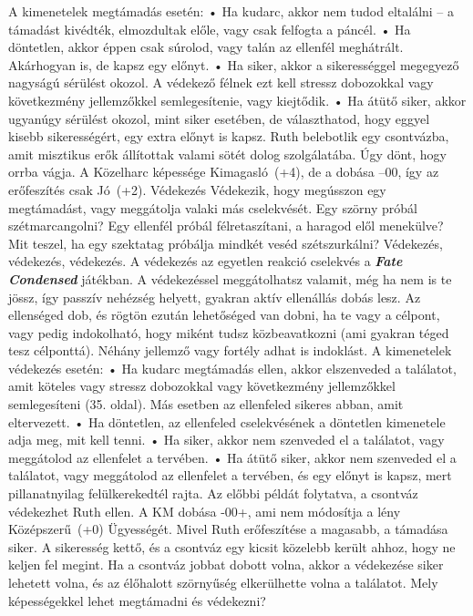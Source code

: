 \documentclass[oneside]{book}
\newcommand{\fate}[1]{\textbf{\textit{#1}}}
\begin{document}
A kimenetelek megtámadás esetén:
    • Ha kudarc, akkor nem tudod eltalálni – a támadást kivédték, elmozdultak előle, vagy csak felfogta a páncél.
    • Ha döntetlen, akkor éppen csak súrolod, vagy talán az ellenfél meghátrált. Akárhogyan is, de kapsz egy előnyt.
    • Ha siker, akkor a sikerességgel megegyező nagyságú sérülést okozol. A védekező félnek ezt kell stressz dobozokkal vagy következmény jellemzőkkel semlegesítenie, vagy kiejtődik.
    • Ha átütő siker, akkor ugyanúgy sérülést okozol, mint siker esetében, de választhatod, hogy eggyel kisebb sikerességért, egy extra előnyt is kapsz.
Ruth belebotlik egy csontvázba, amit misztikus erők állítottak valami sötét dolog szolgálatába. Úgy dönt, hogy orrba vágja. A Közelharc képessége Kimagasló~(+4), de a dobása --00, így az erőfeszítés csak Jó~(+2).
Védekezés
Védekezik, hogy megússzon egy megtámadást, vagy meggátolja valaki más cselekvését.
Egy szörny próbál szétmarcangolni? Egy ellenfél próbál félretaszítani, a haragod elől menekülve? Mit teszel, ha egy szektatag próbálja mindkét veséd szétszurkálni? Védekezés, védekezés, védekezés.
A védekezés az egyetlen reakció cselekvés a \fate{Fate Condensed} játékban. A védekezéssel meggátolhatsz valamit, még ha nem is te jössz, így passzív nehézség helyett, gyakran aktív ellenállás dobás lesz. Az ellenséged dob, és rögtön ezután lehetőséged van dobni, ha te vagy a célpont, vagy pedig indokolható, hogy miként tudsz közbeavatkozni (ami gyakran téged tesz célponttá). Néhány jellemző vagy fortély adhat is indoklást.
A kimenetelek védekezés esetén:
    • Ha kudarc megtámadás ellen, akkor elszenveded a találatot, amit köteles vagy stressz dobozokkal vagy következmény jellemzőkkel semlegesíteni (35. oldal). Más esetben az ellenfeled sikeres abban, amit eltervezett.
    • Ha döntetlen, az ellenfeled cselekvésének a döntetlen kimenetele adja meg, mit kell tenni.
    • Ha siker, akkor nem szenveded el a találatot, vagy meggátolod az ellenfelet a tervében.
    • Ha átütő siker, akkor nem szenveded el a találatot, vagy meggátolod az ellenfelet a tervében, és egy előnyt is kapsz, mert pillanatnyilag felülkerekedtél rajta.
Az előbbi példát folytatva, a csontváz védekezhet Ruth ellen. A KM dobása -00+, ami nem módosítja a lény Középszerű~(+0) Ügyességét.
Mivel Ruth erőfeszítése a magasabb, a támadása siker. A sikeresség kettő, és a csontváz egy kicsit közelebb került ahhoz, hogy ne keljen fel megint. Ha a csontváz jobbat dobott volna, akkor a védekezése siker lehetett volna, és az élőhalott szörnyűség elkerülhette volna a találatot.
Mely képességekkel lehet megtámadni és védekezni?
\end{document}
